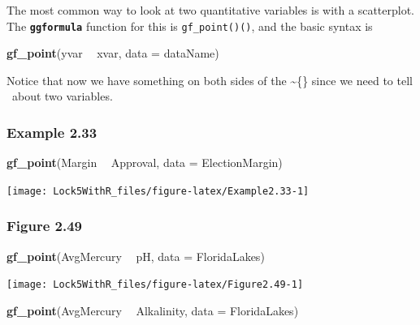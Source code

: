 \documentclass[]{book}
\newenvironment{Shaded}{\begin{snugshade}}{\end{snugshade}}
\newcommand{\DataTypeTok}[1]{\textcolor[rgb]{0.13,0.29,0.53}{#1}}
\newcommand{\KeywordTok}[1]{\textcolor[rgb]{0.13,0.29,0.53}{\textbf{#1}}}
\newcommand{\NormalTok}[1]{#1}
\newcommand{\OperatorTok}[1]{\textcolor[rgb]{0.81,0.36,0.00}{\textbf{#1}}}
\newcommand{\StringTok}[1]{\textcolor[rgb]{0.31,0.60,0.02}{#1}}
\begin{document}
The most common way to look at two quantitative variables is with a scatterplot. The \textbf{\texttt{ggformula}} function for this is \texttt{gf\_point()()}, and the basic syntax is

\begin{Shaded}
\begin{Highlighting}[]
\KeywordTok{gf_point}\NormalTok{(yvar }\OperatorTok{~}\StringTok{ }\NormalTok{xvar, }\DataTypeTok{data =}\NormalTok{ dataName)}
\end{Highlighting}
\end{Shaded}

Notice that now we have something on both sides of the \textasciitilde\{\} since we need to tell \R~about two variables.

\hypertarget{example-2.33}{%
\subsubsection{Example 2.33}\label{example-2.33}}

\begin{Shaded}
\begin{Highlighting}[]
\KeywordTok{gf_point}\NormalTok{(Margin }\OperatorTok{~}\StringTok{ }\NormalTok{Approval, }\DataTypeTok{data =}\NormalTok{ ElectionMargin)}
\end{Highlighting}
\end{Shaded}

\texttt{[image: Lock5WithR\_files/figure-latex/Example2.33-1]}

\hypertarget{figure-2.49}{%
\subsubsection{Figure 2.49}\label{figure-2.49}}

\begin{Shaded}
\begin{Highlighting}[]
\KeywordTok{gf_point}\NormalTok{(AvgMercury }\OperatorTok{~}\StringTok{ }\NormalTok{pH, }\DataTypeTok{data =}\NormalTok{ FloridaLakes)}
\end{Highlighting}
\end{Shaded}

\texttt{[image: Lock5WithR\_files/figure-latex/Figure2.49-1]}

\begin{Shaded}
\begin{Highlighting}[]
\KeywordTok{gf_point}\NormalTok{(AvgMercury }\OperatorTok{~}\StringTok{ }\NormalTok{Alkalinity, }\DataTypeTok{data =}\NormalTok{ FloridaLakes)}
\end{Highlighting}
\end{Shaded}
\end{document}
